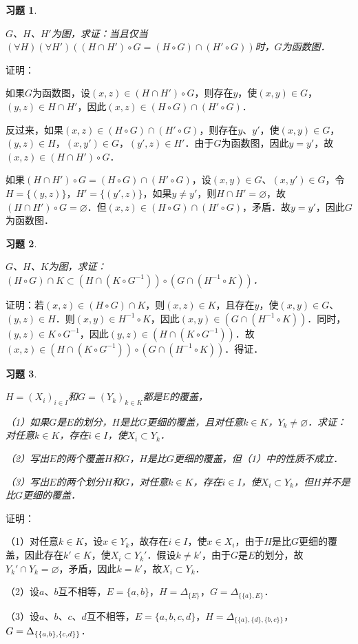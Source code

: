 \documentclass[12pt, a4paper, oneside]{book}
\newtheorem{exer}{习题}
\begin{document}
			\begin{exer}\label{exer59}
				\hfill\par
				$G$、$H$、$H'$为图，求证：当且仅当$(\forall H)(\forall H')((H\cap H')\circ G=(H\circ G)\cap(H'\circ G))$时，$G$为函数图．
			\end{exer}
			证明：
			\par
			如果$G$为函数图，设$(x, z)\in (H\cap H')\circ G$，则存在$y$，使$(x, y)\in G$，$(y, z)\in H\cap H'$，因此$(x, z)\in (H\circ G)\cap(H'\circ G)$．
			\par
			反过来，如果$(x, z)\in (H\circ G)\cap(H'\circ G)$，则存在$y$、$y'$，使$(x, y)\in G$，$(y, z)\in H$，$(x, y')\in G$，$(y', z)\in H'$．由于$G$为函数图，因此$y=y'$，故$(x, z)\in (H\cap H')\circ G$．
			\par
			如果$(H\cap H')\circ G=(H\circ G)\cap(H'\circ G)$，设$(x, y) \in G$、$(x, y') \in G$，令$H=\{(y, z)\}$，$H'=\{(y', z)\}$，如果$y\neq y'$，则$H\cap H'=\varnothing$，故$(H\cap H')\circ G=\varnothing$．但$(x, z)\in (H\circ G)\cap(H'\circ G)$，矛盾．故$y=y'$，因此$G$为函数图．
			
			\begin{exer}\label{exer60}
				\hfill\par
				$G$、$H$、$K$为图，求证：$(H\circ G)\cap K\subset (H\cap (K\circ G^{-1}))\circ (G\cap (H^{-1}\circ K))$．
			\end{exer}
			证明：若$(x, z)\in (H\circ G)\cap K$，则$(x, z)\in K$，且存在$y$，使$(x, y)\in G$、$(y, z)\in H$．则$(x, y)\in H^{-1}\circ K$，因此$(x, y)\in (G\cap(H^{-1}\circ K))$．同时，$(y, z)\in K\circ G^{-1}$，因此$(y, z)\in (H\cap(K\circ G^{-1}))$．故$(x, z)\in (H\cap (K\circ G^{-1}))\circ (G\cap(H^{-1}\circ K))$．得证．
		
			\begin{exer}\label{exer61}
				\hfill\par
				$H=(X_i)_{i\in I}$和$G=(Y_k)_{k\in K}$都是$E$的覆盖，
				\par
				（1）如果$G$是$E$的划分，$H$是比$G$更细的覆盖，且对任意$k\in K$，$Y_k\neq \varnothing$．求证：对任意$k\in K$，存在$i\in I$，使$X_i\subset Y_k$．
				\par
				（2）写出$E$的两个覆盖$H$和$G$，$H$是比$G$更细的覆盖，但（1）中的性质不成立．
				\par
				（3）写出$E$的两个划分$H$和$G$，对任意$k\in K$，存在$i\in I$，使$X_i\subset Y_k$，但$H$并不是比$G$更细的覆盖．
			\end{exer}
			证明：
			\par
			（1）对任意$k\in K$，设$x\in Y_k$，故存在$i\in I$，使$x\in X_i$，由于$H$是比$G$更细的覆盖，因此存在$k' \in K$，使$X_i\subset Y_k'$．假设$k\neq k'$，由于$G$是$E$的划分，故$Y_k'\cap Y_k=\varnothing$，矛盾，因此$k=k'$，故$X_i\subset Y_k$．
			\par
			（2）设$a$、$b$互不相等，$E=\{a, b\}$，$H=\Delta_{\{E\}}$，$G=\Delta_{\{\{a\}, E\}}$．
			\par
			（3）设$a$、$b$、$c$、$d$互不相等，$E=\{a, b, c, d\}$，$H=\Delta_{\{\{a\}, \{d\}, \{b, c\}\}}$，$G=\Delta_{\{\{a, b\}, \\\{c, d\}\}}$．
\end{document}
